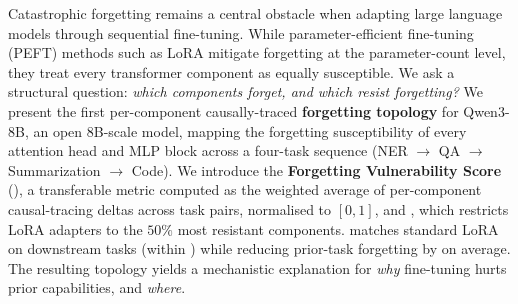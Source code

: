 Catastrophic forgetting remains a central obstacle when adapting large language models through sequential fine-tuning. While parameter-efficient fine-tuning (PEFT) methods such as LoRA \citep{hu2022lora} mitigate forgetting at the parameter-count level, they treat every transformer component as equally susceptible. We ask a structural question: \textit{which components forget, and which resist forgetting?} We present the first per-component causally-traced \textbf{forgetting topology} for Qwen3-8B, an open 8B-scale model, mapping the forgetting susceptibility of every attention head and MLP block across a four-task sequence (NER $\rightarrow$ QA $\rightarrow$ Summarization $\rightarrow$ Code). We introduce the \textbf{Forgetting Vulnerability Score} (\fvs{}), a transferable metric computed as the weighted average of per-component causal-tracing deltas across task pairs, normalised to $[0,1]$, and \textbf{\tglora{}}, which restricts LoRA adapters to the $50\%$ most resistant components. \tglora{} matches standard LoRA on downstream tasks (within ) while reducing prior-task forgetting by  on average. The resulting topology yields a mechanistic explanation for \textit{why} fine-tuning hurts prior capabilities, and \textit{where}.
